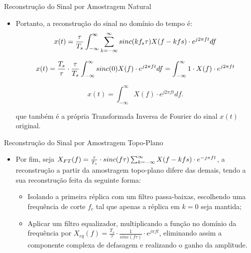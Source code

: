 \documentclass{beamer}
\begin{document}
\begin{frame}{Reconstrução do Sinal por Amostragem Natural}
    \begin{itemize}
        \item Portanto, a reconstrução do sinal no domínio do tempo é:
        \begin{equation}
                    x(t) = {{\tau}\over {T_s}} \int_{-\infty}^{\infty} \sum_{k=-\infty}^{\infty} sinc(kf_s \tau) X(f-kfs) \cdot e^{j2\pi ft} df
        \end{equation}

        \begin{equation*}
                    x(t) = \frac{T_s}{\tau} \cdot {{\tau}\over {T_s}} \int_{-\infty}^{\infty}sinc(0) X(f) \cdot e^{j2\pi ft} df = \int_{-\infty}^{\infty}1 \cdot X(f) \cdot e^{j2\pi ft}
        \end{equation*}

        \begin{equation}
                    x(t) = \int_{-\infty}^{\infty} X(f) \cdot e^{j2\pi ft} df.
        \end{equation}

        que também é a própria Transformada Inversa de Fourier do sinal $x(t)$ original.
    \end{itemize}
\end{frame}

\begin{frame}{Reconstrução do Sinal por Amostragem Topo-Plano}
    \begin{itemize}
        \item Por fim, seja $X_{FT}(f) = {{\tau}\over {T_s}} \cdot sinc(f\tau) \sum_{k=-\infty}^{\infty} X(f-kfs) \cdot e^{-j\pi ft}$, a reconstrução a partir da amostragem topo-plano difere das demais, tendo a sua reconstrução feita da seguinte forma:
            \begin{itemize}
                \item Isolando a primeira réplica com um filtro passa-baixas, escolhendo uma frequência de corte $f_c$ tal que apenas a réplica em $k=0$ seja mantida;
                \item Aplicar um filtro equalizador, multiplicando a função no domínio da frequência por $X_{eq}(f)=\frac{T_s}{\tau} \cdot \frac{1}{sinc(f\tau)} \cdot e^{j\pi ft}$, eliminando assim a componente complexa de defasagem e realizando o ganho da amplitude.
            \end{itemize}
    \end{itemize}
\end{frame}
\end{document}
